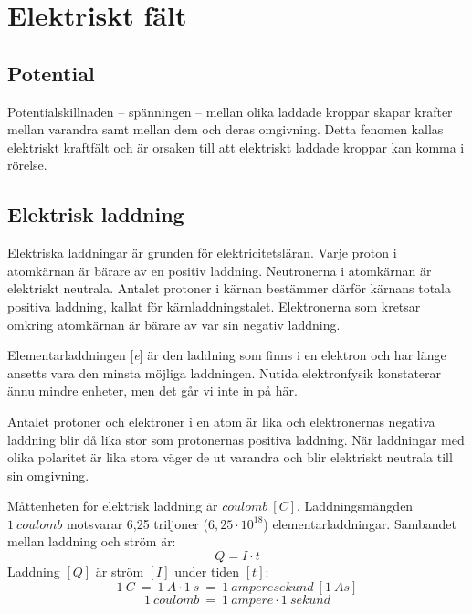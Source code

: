\section{Elektriskt fält}
\label{elektriskafält}

\subsection{Potential}

Potentialskillnaden -- spänningen -- mellan olika laddade kroppar skapar
krafter mellan varandra samt mellan dem och deras omgivning.
Detta fenomen kallas elektriskt kraftfält och är orsaken till att elektriskt
laddade kroppar kan komma i rörelse.

\subsection{Elektrisk laddning}

Elektriska laddningar är grunden för elektricitetsläran.
Varje proton i atomkärnan är bärare av en positiv laddning.
Neutronerna i atomkärnan är elektriskt neutrala.
Antalet protoner i kärnan bestämmer därför kärnans totala positiva
laddning, kallat för kärnladdningstalet.
Elektronerna som kretsar omkring atomkärnan är bärare av var sin negativ
laddning.

Elementarladdningen [\emph{e}] är den laddning som finns i en elektron och har
länge ansetts vara den minsta möjliga laddningen.
Nutida elektronfysik konstaterar ännu mindre enheter, men det går vi inte in på
här.

Antalet protoner och elektroner i en atom är lika och elektronernas
negativa laddning blir då lika stor som protonernas positiva laddning.
När laddningar med olika polaritet är lika stora väger de ut varandra och blir
elektriskt neutrala till sin omgivning.

Måttenheten för elektrisk laddning är \(coulomb\ [C]\).
Laddningsmängden \(1\ coulomb\) motsvarar 6,25 triljoner (\(6,25\cdot10^{18}\))
elementarladdningar. Sambandet mellan laddning och ström är:
\[Q = I \cdot t\]
Laddning $[Q]$ är ström $[I]$ under tiden $[t]$:
\[1\ C ~=~ 1\ A \cdot 1\ s ~=~ 1\ \textit{amperesekund}\ [1\ As]\]
\[1\ \textit{coulomb} ~=~ 1\ \textit{ampere} \cdot 1\ \textit{sekund}\]

